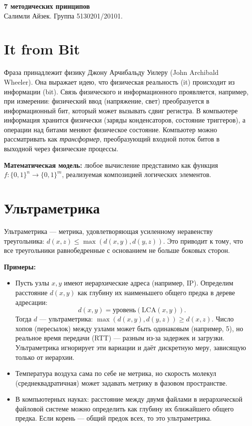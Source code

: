 \documentclass[areasetadvanced]{scrartcl}
\begin{document}
    \sloppy
    \begin{center}
        \Huge{\textbf{7 методических принципов}} 
        \\[20cm]
        \large{Салимли Айзек. Группа 5130201/20101.}
    \end{center}
    \newpage
        \section{It from Bit}
            Фраза принадлежит физику Джону Арчибальду Уилеру (John Archibald Wheeler). 
            Она выражает идею, что физическая реальность (it) происходит из информации (bit).
            Связь физического и информационного проявляется, например, при измерении: 
            физический ввод (напряжение, свет) преобразуется в информационный бит, который может вызывать сдвиг регистра.
            В компьютере информация хранится физически (заряды конденсаторов, состояние триггеров), 
            а операции над битами меняют физическое состояние. Компьютер можно рассматривать как \emph{трансформер}, 
            преобразующий входной поток битов в выходной через физические процессы.

            \textbf{Математическая модель:} любое вычисление представимо как функция 
            $f: \{0,1\}^n \to \{0,1\}^m$, реализуемая композицией логических элементов.

        \section{Ультраметрика}
            Ультраметрика — метрика, удовлетворяющая усиленному неравенству треугольника:
            $d(x,z) \le \max(d(x,y), d(y,z))$. 
            Это приводит к тому, что все треугольники равнобедренные с основанием не больше боковых сторон.

            \textbf{Примеры:}
            \begin{itemize}
                \item Пусть узлы $x, y$ имеют иерархические адреса (например, IP). 
                Определим расстояние $d(x,y)$ как глубину их наименьшего общего предка в дереве адресации:
                \[
                d(x,y) = \text{уровень}(\text{LCA}(x,y)).
                \]
                Тогда $d$ — ультраметрика: $\max(d(x,y), d(y,z)) \ge d(x,z)$.
                Число хопов (пересылок) между узлами может быть одинаковым (например, 5), 
                но реальное время передачи (RTT) — разным из-за задержек и загрузки. 
                Ультраметрика игнорирует эти вариации и даёт дискретную меру, зависящую только от иерархии.
                \item Температура воздуха сама по себе не метрика, но скорость молекул (среднеквадратичная) может задавать метрику 
                в фазовом пространстве.
                \item В компьютерных науках: расстояние между двумя файлами в иерархической файловой системе можно определить 
                как глубину их ближайшего общего предка. Если корень — общий предок всех, то это ультраметрика.
            \end{itemize}
\end{document}
